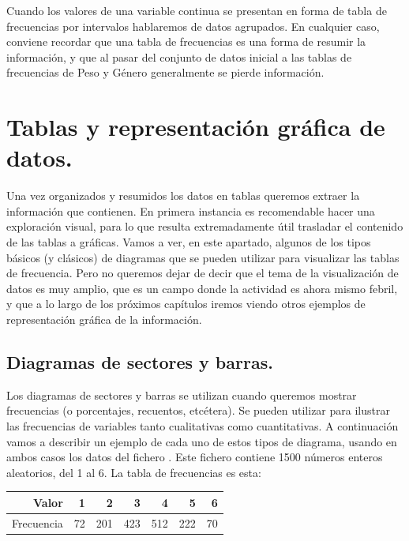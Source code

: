 Cuando los valores de una variable continua se presentan en
forma de tabla de frecuencias por intervalos hablaremos de {\sf datos
agrupados}. En cualquier caso, conviene recordar que una tabla de frecuencias es
una forma de resumir la información, y que al pasar del conjunto de datos
inicial a las tablas de frecuencias de Peso y Género generalmente se pierde
información.



\section{Tablas y representación gráfica de datos.}
\label{cap01:sec:TablasRepresentacionGraficaDatos}

Una vez organizados y resumidos los datos en tablas queremos
extraer la información que contienen. En primera instancia es recomendable
hacer una exploración visual, para lo que resulta extremadamente útil
trasladar el contenido de las tablas a gráficas. Vamos a ver, en este apartado, algunos de los tipos básicos
(y clásicos) de diagramas que se pueden utilizar para visualizar las tablas de frecuencia. Pero no queremos dejar de
decir que el tema de la visualización de datos es muy amplio, que es un campo donde la actividad es ahora mismo febril,
y que a lo largo de los próximos capítulos iremos viendo otros ejemplos de representación gráfica de la información.
%

\subsection{Diagramas de sectores y barras.}
\label{cap01:subsec:DiagramasSectoresBarras}

Los diagramas de sectores y barras se utilizan cuando queremos mostrar
  frecuencias (o porcentajes, recuentos, etcétera). Se pueden utilizar
  para ilustrar las frecuencias de variables tanto cualitativas como
  cuantitativas. A continuación vamos a describir un ejemplo de cada uno de estos tipos de diagrama, usando en ambos
  casos los datos del fichero . Este fichero
  contiene 1500 números enteros aleatorios, del 1 al 6.  La tabla de frecuencias es esta:
  \begin{center}
    \begin{tabular}{rrrrrrr}
      \hline
      Valor & 1 & 2 & 3 & 4 & 5 & 6 \\
      \hline
      Frecuencia &  72 & 201 & 423 & 512 & 222 &  70 \\
      \hline
    \end{tabular}
  \end{center}

